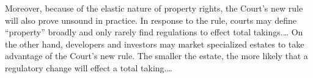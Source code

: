 Moreover, because of the elastic nature of property rights, the Court's new rule
will also prove unsound in practice. In response to the rule, courts may define
``property'' broadly and only rarely find regulations to effect total
takings.\ldots
%
On the other hand, developers and investors may market specialized estates to
take advantage of the Court's new rule. The smaller the estate, the more likely
that a regulatory change will effect a total taking.\ldots
%
